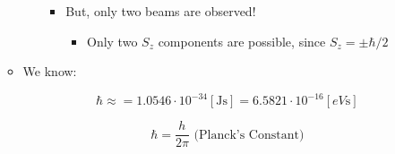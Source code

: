 \begin{itemize}
\begin{itemize}
\begin{itemize}
            \begin{itemize}

              \item But, only two beams are observed!

                \begin{itemize}

                  \item Only two $S_z$ components are possible, since $S_z=\pm \hbar/2$

                \end{itemize}

            \end{itemize}

        \end{itemize}

      \item We know:

        $$\hbar\approx=1.0546\cdot10^{-34}[\si{\joule\second}]=6.5821\cdot10^{-16}[\si{eV\second}]$$

        $$\hbar=\frac{h}{2\pi}\text{ (Planck's Constant)}$$

    \end{itemize}

\end{itemize}



